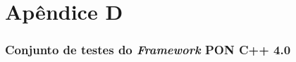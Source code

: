 \chapter*{Apêndice D}\label{ap:testes}
\subsection*{Conjunto de testes do \textit{Framework} PON C++ 4.0}


